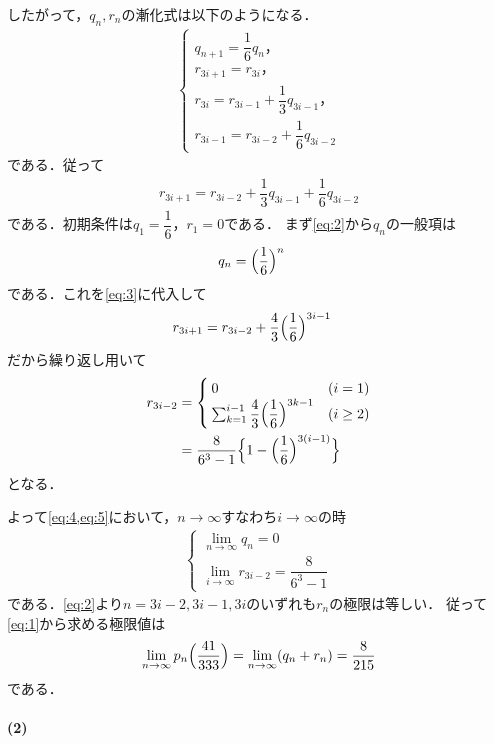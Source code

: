\documentclass[../../main.tex]{subfiles}
\begin{document}
したがって，$q_n,r_n$の漸化式は以下のようになる．
\begin{align}
  \begin{cases}
    q_{n+1}=\dfrac{1}{6}q_n，\\
    r_{3i+1}=r_{3i}，\\
    r_{3i}  =r_{3i-1}+\dfrac{1}{3}q_{3i-1}，\\
    r_{3i-1}=r_{3i-2}+\dfrac{1}{6}q_{3i-2}
  \end{cases} \label{eq:2}
\end{align}
である．従って
\begin{align}
  r_{3i+1} = r_{3i-2} + \dfrac{1}{3}q_{3i-1} + \dfrac{1}{6}q_{3i-2} \label{eq:3}
\end{align}
である．初期条件は$q_1=\dfrac{1}{6}$，$r_1=0$である．
まず\cref{eq:2}から$q_{n}$の一般項は
\begin{align}
  q_n&=\Bigl(\dfrac{1}{6}\Bigr)^n \label{eq:4}
\end{align}
である．これを\cref{eq:3}に代入して
\begin{align}
  r_{3i+1}&=r_{3i-2}+\dfrac{4}{3}\Bigl(\dfrac{1}{6}\Bigr)^{3i-1}
\end{align}
だから繰り返し用いて
\begin{align}
  r_{3i-2} &=
  \begin{cases}
    0 & (i=1) \\
    \sum_{k=1}^{i-1}\dfrac{4}{3}\Bigl(\dfrac{1}{6}\Bigr)^{3k-1} & (i \ge 2)
  \end{cases} \\
  &= \dfrac{8}{6^3-1}\Bigl\{1-\Bigl(\dfrac{1}{6}\Bigr)^{3(i-1)}\Bigr\} \label{eq:5}
\end{align}
となる．

よって\cref{eq:4,eq:5}において，$n\to\infty$すなわち$i\to\infty$の時
\begin{align}
  \begin{cases}
    \lim_{n\to\infty}q_{n}   = 0  \\
    \lim_{i\to\infty}r_{3i-2}= \dfrac{8}{6^3-1}
  \end{cases}
\end{align}
である．\cref{eq:2}より$n=3i-2,3i-1,3i$のいずれも$r_{n}$の極限は等しい．
従って\cref{eq:1}から求める極限値は
\begin{align}
  \lim_{n\to\infty}p_n\Bigl(\dfrac{41}{333}\Bigr)
  = \lim_{n\to\infty}(q_n+r_n)
  = \dfrac{8}{215}
\end{align}
である．

\paragraph{(2)}
\end{document}
